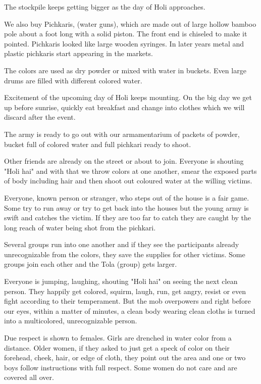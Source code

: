 The stockpile keeps getting bigger as the day of Holi approaches. 

We also buy Pichkaris, (water guns),  which are made out of large hollow
bamboo pole about a foot long with a solid piston. The front end is
chiseled to make it pointed. Pichkaris looked like large wooden syringes.
In later years metal and plastic pichkaris start appearing in the markets. 

The colors are used as dry powder or mixed with water in buckets. Even
large drums are filled with different colored water. 

Excitement of the upcoming day of Holi  keeps mounting. On the big day we
get up before sunrise, quickly eat breakfast and change into clothes which
we will discard after the event. 

The army is ready to go out with our armamentarium of packets of powder,
bucket full of colored water and full pichkari ready to shoot. 

Other friends are already on the street or about to join. Everyone is
shouting "Holi hai" and with that we throw colors at one another, smear
the exposed parts of body including hair and then shoot out coloured water
at the willing victims. 

Everyone, known person or stranger, who steps out of the house is a fair
game. Some try to run away or try to get back into the houses but the
young army is swift and catches the victim. If they are too far to catch
they are caught by the long reach of water being shot from the pichkari. 

Several groups run into one another and if they see the participants
already unrecognizable from the colors, they save the supplies for other
victims. Some groups join each other and the Tola (group) gets larger. 

Everyone is jumping, laughing, shouting "Holi hai" on seeing the next
clean person. They happily get colored, squirm, laugh, run, get angry,
resist or even fight according to their temperament. But the mob
overpowers and right before our eyes, within a matter of minutes, a clean
body wearing clean cloths is turned into a multicolored, unrecognizable
person. 

Due respect is shown to females. Girls are drenched in water color from
a distance. Older women, if they asked to just get a speck of color on
their forehead, cheek, hair, or edge of cloth, they point out the area and
one or two boys follow instructions with full respect. Some women do not
care and are covered all over. 

